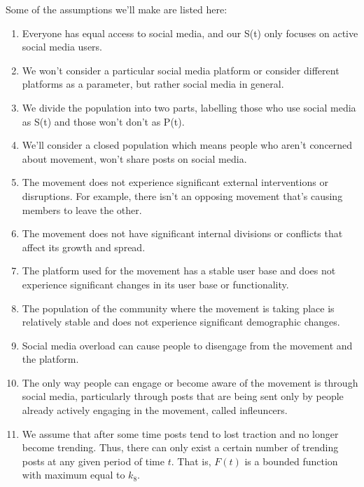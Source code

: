 \documentclass{article}
\begin{document}
    Some of the assumptions we'll make are listed here:
    \begin{enumerate}
    \item  Everyone has equal access to social media, and our S(t) only focuses on active social media users.
    
    \item We won't consider a particular social media platform or consider different platforms as a parameter, but rather social media in general. 
    
    \item We divide the population into two parts, labelling those who use social media as S(t) and those won't don't as P(t). 
    
    \item We'll consider a closed population which means people who aren't concerned about movement, won't share posts on social media. 
    
    \item The movement does not experience significant external interventions or disruptions. For example, there isn't an opposing movement that's causing members to leave the other. 
    
    \item The movement does not have significant internal divisions or conflicts that affect its growth and spread.
    
    \item The platform used for the movement has a stable user base and does not experience significant changes in its user base or functionality.

    \item The population of the community where the movement is taking place is relatively stable and does not experience significant demographic changes.

    \item Social media overload can cause people to disengage from the movement and the platform.
    
    \item  The only way people can engage or become aware of the movement is through social media, particularly through posts that are being sent only by people already actively engaging in the movement, called infleuncers. 
    
    \item  We assume that after some time posts tend to lost traction and no longer become trending. Thus, there can only exist a certain number of trending posts at any given period of time $t$. That is, $F(t)$ is a bounded function with maximum equal to $k_8$. 


\end{enumerate}
\end{document}
